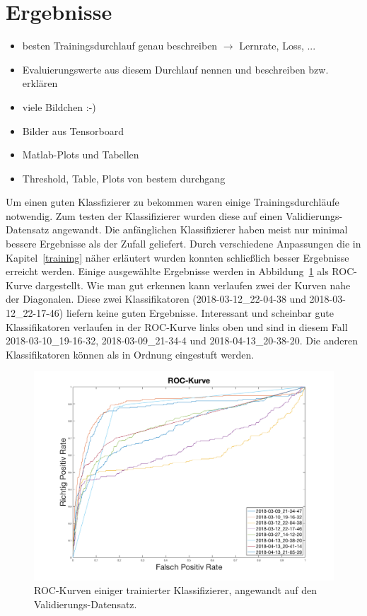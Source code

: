 \section{Ergebnisse}
\color{red}
\begin{itemize}
	\item besten Trainingsdurchlauf genau beschreiben $\rightarrow$ Lernrate, Loss, ...
	\item Evaluierungswerte aus diesem Durchlauf nennen und beschreiben bzw. erklären
	\item viele Bildchen :-) 
	\item Bilder aus Tensorboard
	\item Matlab-Plots und Tabellen 
    \item Threshold, Table, Plots von bestem durchgang
\end{itemize}
\color{black}

Um einen guten Klassfizierer zu bekommen waren einige Trainingsdurchläufe notwendig. Zum testen der Klassifizierer wurden diese auf einen Validierungs-Datensatz angewandt. Die anfänglichen Klassifizierer haben meist nur minimal bessere Ergebnisse als der Zufall geliefert. Durch verschiedene Anpassungen die in Kapitel~\ref{training} näher erläutert wurden konnten schließlich besser Ergebnisse erreicht werden. Einige ausgewählte Ergebnisse werden in Abbildung~\ref{fig:roc} als ROC-Kurve dargestellt. Wie man gut erkennen kann verlaufen zwei der Kurven nahe der Diagonalen. Diese zwei Klassifikatoren (2018-03-12\_22-04-38 und 2018-03-12\_22-17-46) liefern keine guten Ergebnisse. Interessant und scheinbar gute Klassifikatoren verlaufen in der ROC-Kurve links oben und sind in diesem Fall 2018-03-10\_19-16-32, 2018-03-09\_21-34-4 und 2018-04-13\_20-38-20. Die anderen Klassifikatoren können als in Ordnung eingestuft werden.

\begin{figure}[htb!]
	\begin{center}
		\includegraphics[width=\textwidth]{./pics/evaluation/roc_analysis.png}
		\caption{ROC-Kurven einiger trainierter Klassifizierer, angewandt auf den Validierungs-Datensatz.}
		\label{fig:roc}
    \end{center}
\end{figure}

